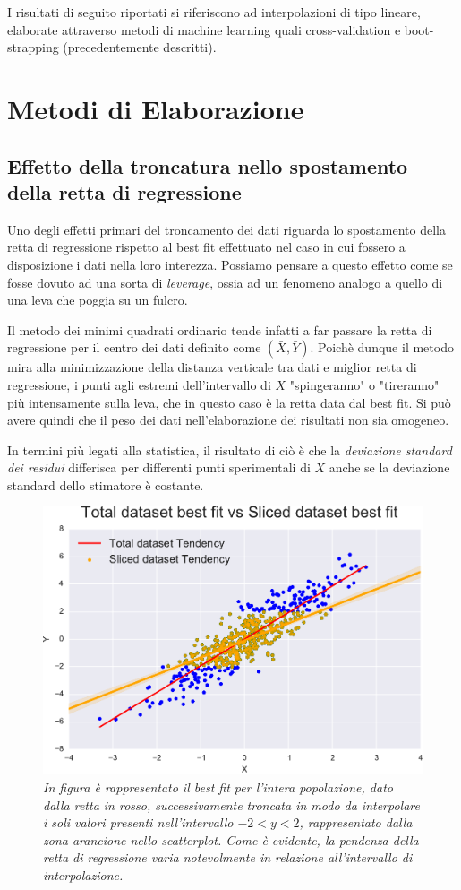 \documentclass[12pt,openright,twoside,a4paper]{book}
\begin{document}
I risultati di seguito riportati si riferiscono ad interpolazioni di tipo lineare, elaborate attraverso metodi di machine learning quali cross-validation e boot-strapping (precedentemente descritti).

\section{Metodi di Elaborazione}

\subsection{Effetto della troncatura nello spostamento della retta di regressione}

Uno degli effetti primari del troncamento dei dati riguarda lo spostamento della retta di regressione rispetto al best fit effettuato nel caso in cui fossero a disposizione i dati nella loro interezza.
Possiamo pensare a questo effetto come se fosse dovuto ad una sorta di \textit{leverage}, ossia ad un fenomeno analogo a quello di una leva che poggia su un fulcro.

Il metodo dei minimi quadrati ordinario tende infatti a far passare la retta di regressione per il centro dei dati definito come $(\bar{X},\bar{Y})$.
Poichè dunque il metodo mira alla minimizzazione della distanza verticale tra dati e miglior retta di regressione, i punti agli estremi dell'intervallo di $X$ "spingeranno" o "tireranno" più intensamente sulla leva, che in questo caso è la retta data dal best fit.
Si può avere quindi che il peso dei dati nell'elaborazione dei risultati non sia omogeneo.

In termini più legati alla statistica, il risultato di ciò è che la \textit{deviazione standard dei residui}  differisca per differenti punti sperimentali di $X$ anche se la deviazione standard dello stimatore è costante.

\begin{figure}[!h]
\centering
\includegraphics[width=0.6\linewidth]{leverage}
\caption{\textit{In figura è rappresentato il best fit per l'intera popolazione, dato dalla retta in rosso, successivamente troncata in modo da interpolare i soli valori presenti nell'intervallo $-2<y<2$, rappresentato dalla zona arancione nello scatterplot.
Come è evidente, la pendenza della retta di regressione varia notevolmente in relazione all'intervallo di interpolazione.}}
\label{leverage}
\end{figure}
\end{document}
